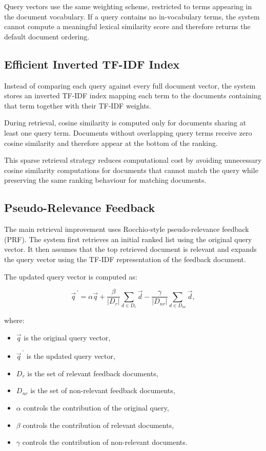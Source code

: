 Query vectors use the same weighting scheme, restricted to terms appearing in
the document vocabulary. If a query contains no in-vocabulary terms, the
system cannot compute a meaningful lexical similarity score and therefore
returns the default document ordering.

\subsection{Efficient Inverted TF-IDF Index}

Instead of comparing each query against every full document vector, the system
stores an inverted TF-IDF index mapping each term to the documents containing
that term together with their TF-IDF weights.

During retrieval, cosine similarity is computed only for documents sharing at
least one query term. Documents without overlapping query terms receive zero
cosine similarity and therefore appear at the bottom of the ranking.

This sparse retrieval strategy reduces computational cost by avoiding
unnecessary cosine similarity computations for documents that cannot match the
query while preserving the same ranking behaviour for matching documents.

\subsection{Pseudo-Relevance Feedback}

The main retrieval improvement uses Rocchio-style pseudo-relevance feedback
(PRF). The system first retrieves an initial ranked list using the original
query vector. It then assumes that the top retrieved document is relevant and
expands the query vector using the TF-IDF representation of the feedback
document.

The updated query vector is computed as:


\begin{equation}
\vec{q}^{\,\prime}
=
\alpha \vec{q}
+
\frac{\beta}{|D_r|}
\sum_{d \in D_r} \vec{d}
-
\frac{\gamma}{|D_{nr}|}
\sum_{d \in D_{nr}} \vec{d},
\label{eq:rocchio}
\end{equation}

where:

\begin{itemize}
    \item $\vec{q}$ is the original query vector,
    \item $\vec{q}^{\,\prime}$ is the updated query vector,
    \item $D_r$ is the set of relevant feedback documents,
    \item $D_{nr}$ is the set of non-relevant feedback documents,
    \item $\alpha$ controls the contribution of the original query,
    \item $\beta$ controls the contribution of relevant documents,
    \item $\gamma$ controls the contribution of non-relevant documents.
\end{itemize}

